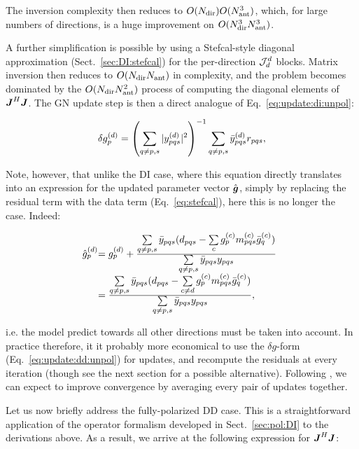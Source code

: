 \documentclass[useAMS,usenatbib]{mn2e}
\newcommand{\mat}[1]{{\bmath{#1}}}
\newcommand{\JJ}{\mat{J}} %
\newcommand{\JHJ}{\JJ^H\JJ} %
\begin{document}
The inversion complexity then reduces to $O(N_\mathrm{dir})O(N_\mathrm{ant}^3)$, which, for large numbers of directions, is a huge improvement on $O(N_\mathrm{dir}^3N_\mathrm{ant}^3)$. 

A further simplification is possible by using a Stefcal-style diagonal approximation (Sect.~\ref{sec:DI:stefcal}) for
the per-direction $\mathcal{J}^d_d$ blocks. Matrix inversion then reduces to $O(N_\mathrm{dir}N_\mathrm{ant})$ in complexity, and the problem becomes dominated by
the $O(N_\mathrm{dir}N_\mathrm{ant}^2)$ process of computing the diagonal elements of $\JHJ$. The GN update step is then a direct analogue of
Eq.~\ref{eq:update:di:unpol}:

\begin{equation}
\label{eq:update:dd:unpol}
\delta g^{(d)}_p = \left( \sum\limits_{q\ne p,s} |y^{(d)}_{pqs}|^2  \right )^{-1} \sum\limits_{q\ne p,s} \bar{y}^{(d)}_{pqs} r_{pqs},
\end{equation}

Note, however, that unlike the DI case, where this equation directly translates into
an expression for the updated parameter vector $\hat{\bmath{g}}$, simply by replacing the residual term with the data 
term (Eq.~\ref{eq:stefcal}), here this is no longer the case. Indeed:

\begin{equation}
\label{eq:stefcal:dd:unpol}
\begin{array}{@{}l@{}l}
\hat{g}_p^{(d)} &= \ggd_p + \frac{
\textstyle \sum\limits_{q\ne p,s} \bar{y}_{pqs} (d_{pqs} - \sum\limits_c \ggc_p \mmc_{pqs} \ggcH_q )
}{
\textstyle \sum\limits_{q\ne p,s} \bar{y}_{pqs} y_{pqs}
} \\
&= \frac{
\textstyle \sum\limits_{q\ne p,s} \bar{y}_{pqs} (d_{pqs} - \sum\limits_{c\ne d} \ggc_p \mmc_{pqs} \ggcH_q )
}{
\textstyle \sum\limits_{q\ne p,s} \bar{y}_{pqs} y_{pqs}
},
\end{array}
\end{equation}

i.e. the model predict towards all other directions must be taken into account. In practice therefore, it it probably more economical 
to use the $\delta g$-form (Eq.~\ref{eq:update:dd:unpol}) for updates, 
and recompute  the residuals at every iteration (though see the next section for a possible alternative). Following \citet{Stefcal}, 
we can expect to improve convergence by averaging every pair of updates together.

Let us now briefly address the fully-polarized DD case. This is a straightforward application of
the operator formalism developed in Sect.~\ref{sec:pol:DI} to the derivations above. As a result, we arrive at the
following expression for $\JHJ$:
\end{document}
